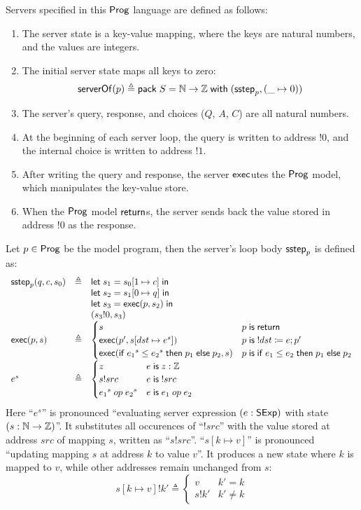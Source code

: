 Servers specified in this $\mathsf{Prog}$ language are defined as follows:
\begin{enumerate}
\item The server state is a key-value mapping, where the keys are natural
  numbers, and the values are integers.
\item The initial server state maps all keys to zero:
  \[\mathsf{serverOf}(p)\triangleq\mathsf{pack}\;S=\mathbb N\to\mathbb Z\;\mathsf{with}\;(\mathsf{sstep}_p,(\_\mapsto0))\]
\item The server's query, response, and choices ($Q$, $A$, $C$) are all
  natural numbers.
\item At the beginning of each server loop, the query is written to address
  $!0$, and the internal choice is written to address $!1$.
\item After writing the query and response, the server $\mathsf{exec}$utes the $\mathsf{Prog}$
  model, which manipulates the key-value store.
\item When the $\mathsf{Prog}$ model $\mathsf{return}$s, the server sends back the value stored
  in address $!0$ as the response.
\end{enumerate}
Let $p\in\mathsf{Prog}$ be the model program, then the server's loop body $\mathsf{sstep}_p$ is
defined as:
\[\begin{array}{lrl}
\mathsf{sstep}_p(q,c,s_0)&\triangleq&\mathsf{let}\; s_1=s_0[1\mapsto c]\;\mathsf{in}\;\\
&&\mathsf{let}\; s_2=s_1[0\mapsto q]\;\mathsf{in}\;\\
&&\mathsf{let}\; s_3=\mathsf{exec}(p,s_2)\;\mathsf{in}\;\\
&&(s_3!0,s_3)\\
\mathsf{exec}(p,s)&\triangleq&
\begin{cases}
  s&p\;\mathsf{is}\;\mathsf{return}\\
  \mathsf{exec}(p',s[dst\mapsto e^s])&p\;\mathsf{is}\; !dst\coloneqq e;p'\\
  \mathsf{exec}(\mathsf{if}\; {e_1}^s\le{e_2}^s\;\mathsf{then}\; p_1\;\mathsf{else}\; p_2,s)&p\;\mathsf{is}\;\mathsf{if}\; e_1\le e_2\;\mathsf{then}\; p_1\;\mathsf{else}\; p_2
\end{cases}\\
e^s&\triangleq&
\begin{cases}
  z&e\;\mathsf{is}\; z:\mathbb Z\\
  s!src&e\;\mathsf{is}\; !src\\
  {e_1}^s\;op\;{e_2}^s&e\;\mathsf{is}\; e_1\;op\; e_2
\end{cases}
\end{array}\]
Here ``$e^s$'' is pronounced ``evaluating server expression $(e:\mathsf{SExp})$ with
state $(s:\mathbb N\to\mathbb Z)$''.  It substitutes all occurences of ``$!src$'' with the
value stored at address $src$ of mapping $s$, written as ``$s!src$''.
``$s[k\mapsto v]$'' is pronounced ``updating mapping $s$ at address $k$ to value
$v$''.  It produces a new state where $k$ is mapped to $v$, while other
addresses remain unchanged from $s$:
\[s[k\mapsto v]!k'\triangleq\begin{cases}v&k'=k\\
s!k'&k'\neq k\end{cases}\]

